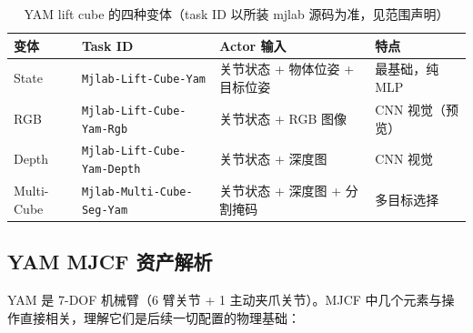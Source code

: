 \begin{table}[ht]
\centering
\small
\caption{YAM lift cube 的四种变体（task ID 以所装 mjlab 源码为准，见范围声明）}
\label{tab:rlmc-manip-variants}
\begin{tabular}{@{}llll@{}}
\toprule
变体 & Task ID & Actor 输入 & 特点 \\
\midrule
State & \verb|Mjlab-Lift-Cube-Yam| & 关节状态 + 物体位姿 + 目标位姿 & 最基础，纯 MLP \\
RGB & \verb|Mjlab-Lift-Cube-Yam-Rgb| & 关节状态 + RGB 图像 & CNN 视觉（预览） \\
Depth & \verb|Mjlab-Lift-Cube-Yam-Depth| & 关节状态 + 深度图 & CNN 视觉 \\
Multi-Cube & \verb|Mjlab-Multi-Cube-Seg-Yam| & 关节状态 + 深度图 + 分割掩码 & 多目标选择 \\
\bottomrule
\end{tabular}
\end{table}

\subsection{YAM MJCF 资产解析}
\label{sec:rlmc-manip-mjcf}

YAM 是 7-DOF 机械臂（6 臂关节 + 1 主动夹爪关节）。MJCF 中几个元素与操作直接相关，理解它们是后续一切配置的物理基础：

